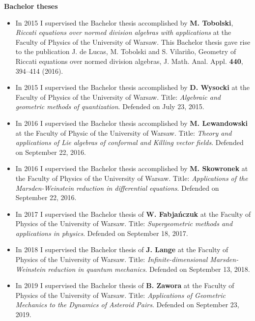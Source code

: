 \documentclass[12pt,reqno]{amsbook}
\begin{document}
\centerline{\bf Bachelor theses}
\begin{itemize}

\item In 2015 I supervised the Bachelor thesis accomplished by {\bf M. Tobolski}, {\it Riccati equations over normed division algebras with applications} at the Faculty of Physics of the University of Warsaw. This Bachelor thesis gave rise to the publication J. de Lucas, M. Tobolski and S. Vilariño,  Geometry of Riccati equations over normed division algebras, J. Math. Anal. Appl. {\bf 440}, 394--414 (2016).

\item In 2015 I supervised the Bachelor thesis accomplished by  {\bf D. Wysocki} at the Faculty of Physics of the University of Warsaw. Title: {\it Algebraic and geometric methods of quantization}. Defended on July 23, 2015.

\item In 2016 I supervised the Bachelor thesis accomplished by {\bf M. Lewandowski} at the Faculty of Physic of the University of Warsaw. Title: {\it Theory and applications of Lie algebras of conformal and Killing vector fields}. Defended on September 22, 2016.

\item In 2016 I supervised the Bachelor thesis accomplished by {\bf M. Skowronek} at the Faculty of Physics of the University of Warsaw. Title: {\it Applications of the Marsden-Weinstein reduction in differential equations}. Defended on September 22, 2016.


\item In 2017 I supervised the Bachelor thesis of {\bf W. Fabja\'nczuk} at the Faculty of Physics of the University of Warsaw. Title: {\it Supergeometric methods and applications in physics}. Defended on September 18, 2017.

\item In 2018 I supervised the Bachelor thesis of {\bf J. Lange} at the Faculty of Physics of the University of Warsaw. Title: {\it Infinite-dimensional Marsden-Weinstein reduction in quantum mechanics}. Defended on September 13, 2018.

\item In 2019 I supervised the Bachelor thesis of {\bf B. Zawora} at the Faculty of Physics of the University of Warsaw. Title: {\it Applications of Geometric Mechanics to the Dynamics of Asteroid Pairs}. Defended on September 23, 2019.


\end{itemize}
\end{document}
